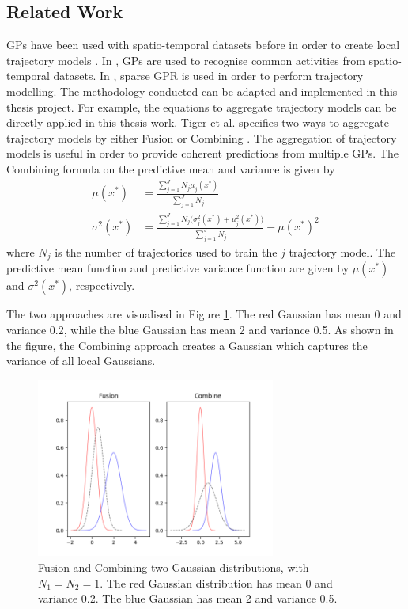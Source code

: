 \subsection{Related Work} \label{sec:trajectory-aggregation}
GPs have been used with spatio-temporal datasets before in order to create local trajectory models \cite{Tiger2015-unsupervised-learning,Tiger2015-online-sparse, Tiger2018-gp-motion-pattern}.
In \cite{Tiger2015-unsupervised-learning}, GPs are used to recognise common activities from spatio-temporal datasets.
In \cite{Tiger2015-online-sparse}, sparse GPR is used in order to perform trajectory modelling.
The methodology conducted can be adapted and implemented in this thesis project.
For example, the equations to aggregate trajectory models can be directly applied in this thesis work.
Tiger et al. specifies two ways to aggregate trajectory models by either Fusion or Combining \cite{Tiger2015-online-sparse}.
The aggregation of trajectory models is useful in order to provide coherent predictions from multiple GPs.
The Combining formula on the predictive mean and variance is given by
\begin{align}
    \mu(x^*) &= \frac{\sum_{j=1}^J N_j \mu_j(x^*) }{\sum_{j=1}^J N_j} \label{eq:combining-mean} \\
    \sigma^2(x^*) &= \frac{\sum_{j=1}^J N_j \big(\sigma^2_j(x^*) + \mu^2_j(x^*)\big)}{\sum_{j=1}^J N_j} - \mu(x^*)^2 \label{eq:combining-var} 
\end{align}
where $N_j$ is the number of trajectories used to train the $j$ trajectory model.
The predictive mean function and predictive variance function are given by $\mu(x^*)$ and $\sigma^2(x^*)$, respectively.

The two approaches are visualised in Figure \ref{fig:aggregation}.
The red Gaussian has mean 0 and variance 0.2, while the blue Gaussian has mean 2 and variance 0.5.
As shown in the figure, the Combining approach creates a Gaussian which captures the variance of all local Gaussians.
\begin{figure} [h!]
    \centering
    \includegraphics[width=0.7\textwidth]{figures/aggregate_test}
    \caption[Fusion and Combining two Gaussian distributions]
    {\small Fusion and Combining two Gaussian distributions, with $N_1 = N_2 = 1$.
    The red Gaussian distribution has mean 0 and variance 0.2. 
    The blue Gaussian has mean 2 and variance 0.5.}
    \label{fig:aggregation}
\end{figure}


